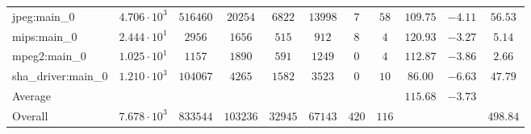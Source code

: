 \begin{tabular}{|l|c|c|c|c|c|c|c|c|c|c|}
jpeg:main\_0            & $ 4.706 \cdot 10^{3} $ & $ 516460 $ & $ 20254  $ & $ 6822  $ & $ 13998 $ & $ 7   $ & $ 58  $ & $ 109.75      $ & $ -4.11   $ & $ 56.53   $ \\
mips:main\_0            & $ 2.444 \cdot 10^{1} $ & $ 2956   $ & $ 1656   $ & $ 515   $ & $ 912   $ & $ 8   $ & $ 4   $ & $ 120.93      $ & $ -3.27   $ & $ 5.14    $ \\
mpeg2:main\_0           & $ 1.025 \cdot 10^{1} $ & $ 1157   $ & $ 1890   $ & $ 591   $ & $ 1249  $ & $ 0   $ & $ 4   $ & $ 112.87      $ & $ -3.86   $ & $ 2.66    $ \\
sha\_driver:main\_0     & $ 1.210 \cdot 10^{3} $ & $ 104067 $ & $ 4265   $ & $ 1582  $ & $ 3523  $ & $ 0   $ & $ 10  $ & $ 86.00       $ & $ -6.63   $ & $ 47.79   $ \\
\hline
Average                 & $                    $ & $        $ & $        $ & $       $ & $       $ & $     $ & $     $ & $ 115.68      $ & $ -3.73   $ & $         $ \\
\hline
Overall                 & $ 7.678 \cdot 10^{3} $ & $ 833544 $ & $ 103236 $ & $ 32945 $ & $ 67143 $ & $ 420 $ & $ 116 $ & $             $ & $         $ & $ 498.84  $ \\
\hline
\end{tabular}
